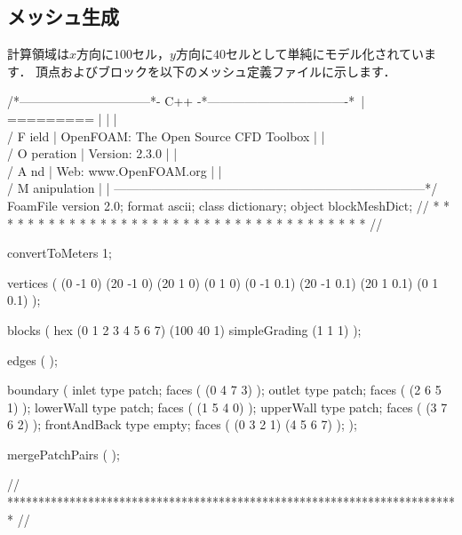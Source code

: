 \subsection{メッシュ生成}
\label{ssec:3.5.2}
計算領域は$x$方向に$100$セル，$y$方向に$40$セルとして単純にモデル化されています．
頂点およびブロックを以下のメッシュ定義ファイルに示します．
\begin{OFverbatim}
/*--------------------------------*- C++ -*----------------------------------*\
| =========                 |                                                 |
| \\      /  F ield         | OpenFOAM: The Open Source CFD Toolbox           |
|  \\    /   O peration     | Version:  2.3.0                                 |
|   \\  /    A nd           | Web:      www.OpenFOAM.org                      |
|    \\/     M anipulation  |                                                 |
\*---------------------------------------------------------------------------*/
FoamFile
{
    version     2.0;
    format      ascii;
    class       dictionary;
    object      blockMeshDict;
}
// * * * * * * * * * * * * * * * * * * * * * * * * * * * * * * * * * * * * * //

convertToMeters 1;

vertices        
(
    (0 -1 0)
    (20 -1 0)
    (20 1 0)
    (0 1 0)
    (0 -1 0.1)
    (20 -1 0.1)
    (20 1 0.1)
    (0 1 0.1)
);

blocks          
(
    hex (0 1 2 3 4 5 6 7) (100 40 1) simpleGrading (1 1 1)
);

edges           
(
);

boundary
(
    inlet
    {
        type patch;
        faces
        (
            (0 4 7 3)
        );
    }
    outlet
    {
        type patch;
        faces
        (
            (2 6 5 1)
        );
    }
    lowerWall
    {
        type patch;
        faces
        (
            (1 5 4 0)
        );
    }
    upperWall
    {
        type patch;
        faces
        (
            (3 7 6 2)
        );
    }
    frontAndBack
    {
        type empty;
        faces
        (
            (0 3 2 1)
            (4 5 6 7)
        );
    }
);

mergePatchPairs
(
);

// ************************************************************************* //
\end{OFverbatim}


